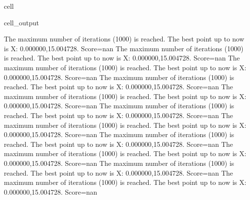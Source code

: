 \documentclass[letterpaper,10pt,english]{jupyterBook}
\begin{document}
\begin{sphinxuseclass}{cell}
\begin{sphinxVerbatimOutput}
\begin{sphinxuseclass}{cell_output}
\begin{sphinxVerbatim}[commandchars=\\\{\}]
The maximum number of iterations (1000) is reached. The best point up to now is X: \PYGZob{}0.000000,15.004728\PYGZcb{}. Score=\PYGZhy{}nan
The maximum number of iterations (1000) is reached. The best point up to now is X: \PYGZob{}0.000000,15.004728\PYGZcb{}. Score=\PYGZhy{}nan
The maximum number of iterations (1000) is reached. The best point up to now is X: \PYGZob{}0.000000,15.004728\PYGZcb{}. Score=\PYGZhy{}nan
The maximum number of iterations (1000) is reached. The best point up to now is X: \PYGZob{}0.000000,15.004728\PYGZcb{}. Score=\PYGZhy{}nan
The maximum number of iterations (1000) is reached. The best point up to now is X: \PYGZob{}0.000000,15.004728\PYGZcb{}. Score=\PYGZhy{}nan
The maximum number of iterations (1000) is reached. The best point up to now is X: \PYGZob{}0.000000,15.004728\PYGZcb{}. Score=\PYGZhy{}nan
The maximum number of iterations (1000) is reached. The best point up to now is X: \PYGZob{}0.000000,15.004728\PYGZcb{}. Score=\PYGZhy{}nan
The maximum number of iterations (1000) is reached. The best point up to now is X: \PYGZob{}0.000000,15.004728\PYGZcb{}. Score=\PYGZhy{}nan
The maximum number of iterations (1000) is reached. The best point up to now is X: \PYGZob{}0.000000,15.004728\PYGZcb{}. Score=\PYGZhy{}nan
The maximum number of iterations (1000) is reached. The best point up to now is X: \PYGZob{}0.000000,15.004728\PYGZcb{}. Score=\PYGZhy{}nan
The maximum number of iterations (1000) is reached. The best point up to now is X: \PYGZob{}0.000000,15.004728\PYGZcb{}. Score=\PYGZhy{}nan
\end{sphinxVerbatim}


\end{sphinxuseclass}
\end{sphinxVerbatimOutput}
\end{sphinxuseclass}
\end{document}
